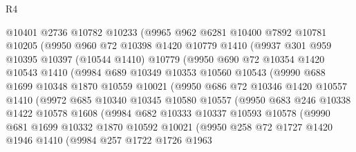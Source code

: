 \begin{lexlean}{R4}
\begin{coremodule}
          @10401
          @2736
          @10782
          @10233
          (@9965
            @962
            @6281
            @10400
            @7892
            @10781
            @10205
            (@9950
              @960
              @72
              @10398
              @1420
              @10779
              @1410
              (@9937
                @301
                @959
                @10395
                @10397
                (@10544 @1410)
                @10779
                (@9950
                  @690
                  @72
                  @10354
                  @1420
                  @10543
                  @1410
                  (@9984
                    @689
                    @10349
                    @10353
                    @10560
                    @10543
                    (@9990
                      @688
                      @1699
                      @10348
                      @1870
                      @10559
                      @10021
                      (@9950
                        @686
                        @72
                        @10346
                        @1420
                        @10557
                        @1410
                        (@9972
                          @685
                          @10340
                          @10345
                          @10580
                          @10557
                          (@9950
                            @683
                            @246
                            @10338
                            @1422
                            @10578
                            @1608
                            (@9984
                              @682
                              @10333
                              @10337
                              @10593
                              @10578
                              (@9990
                                @681
                                @1699
                                @10332
                                @1870
                                @10592
                                @10021
                                (@9950
                                  @258
                                  @72
                                  @1727
                                  @1420
                                  @1946
                                  @1410
                                  (@9984
                                    @257
                                    @1722
                                    @1726
                                    @1963

\end{coremodule}
\end{lexlean}
